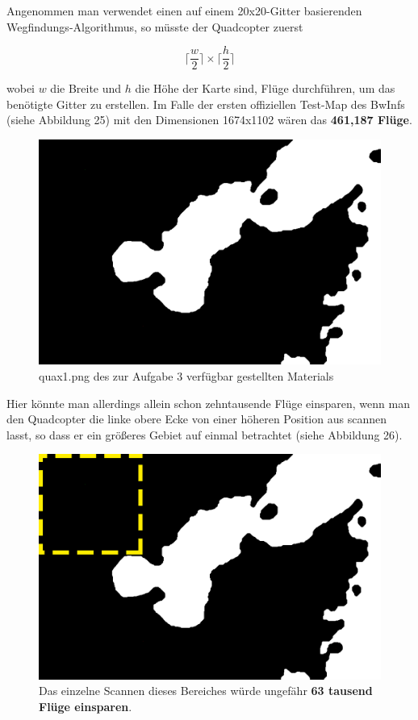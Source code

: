 \documentclass[a4paper,12pt]{article}
\begin{document}
Angenommen man verwendet einen auf einem 20x20-Gitter basierenden Wegfindungs-Algorithmus, so müsste der Quadcopter zuerst
\begin{center}
\begin{Large}
\[\lceil \frac{w}{2}\rceil \times \lceil \frac{h}{2}\rceil\]
\end{Large}
\end{center}
wobei $w$ die Breite und $h$ die Höhe der Karte sind, Flüge durchführen, um das benötigte Gitter zu erstellen.
Im Falle der ersten offiziellen Test-Map des BwInfs (siehe Abbildung 25) mit den Dimensionen 1674x1102 wären das \textbf{461,187 Flüge}.
\begin{figure}[H]
\centering
    \includegraphics[width=0.8\linewidth]{Bilder/Aufgabe3/quax1.png}
    \caption{quax1.png des zur Aufgabe 3 verfügbar gestellten Materials}
\end{figure}
Hier könnte man allerdings allein schon zehntausende Flüge einsparen, wenn man den Quadcopter die linke obere Ecke von einer höheren Position aus scannen lasst, so dass er ein größeres Gebiet auf einmal betrachtet (siehe Abbildung 26).
\begin{figure}[H]
\centering
    \includegraphics[width=0.8\linewidth]{Bilder/Aufgabe3/Einsparung_Fluege.png}
    \caption{Das einzelne Scannen dieses Bereiches würde ungefähr \textbf{63 tausend Flüge einsparen}.}
\end{figure}
\end{document}
